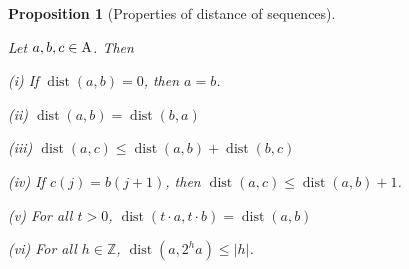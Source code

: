 \documentclass[12pt,reqno]{amsart}
\theoremstyle{plain}
\newtheorem{proposition}[theorem]{Proposition}
\numberwithin{equation}{section}
\theoremstyle{remark}
\newcommand{\uses}[1]{}
\newcommand{\usesdefs}[1]{}
\newcommand{\leanok}{}
\newcommand{\lean}[1]{}
\DeclareMathOperator{\dist}{dist}
\begin{document}
\begin{proposition}[Properties of distance of sequences]\label{Properties of distance of sequences}\uses{}\usesdefs{multiplicatively spaced monotone sequences,Distance of spaced sequences}
\lean{Auto.sequenceDistance_zero_eq,Auto.sequenceDistance_comm,Auto.sequenceDistance_triangle,Auto.sequenceDistance_shift_le,Auto.sequenceDistance_smul,Auto.sequenceDistance_pow_two_smul_le}
\leanok
    Let $a,b,c\in {\rm A}$.
    Then

    (i) If $\dist(a,b)=0$, then $a=b$.

    (ii) $\dist(a,b)=\dist(b,a)$

    (iii) $\dist(a,c)\le \dist(a,b)+\dist(b,c)$

    (iv) If $c(j)=b(j+1)$, then $\dist(a,c)\le \dist(a,b)+1$.

    (v) For all $t>0$, $\dist(t\cdot a,t\cdot b)=\dist(a,b)$

    (vi) For all $h\in\mathbb{Z}$,
    $\dist(a,2^h a)\le |h|$.
\end{proposition}
\end{document}
